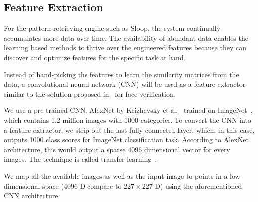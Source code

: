 \subsection{Feature Extraction} 

For the pattern retrieving engine such as Sloop, the system continually
accumulates more data over time. The availability of abundant data enables the
learning based methods to thrive over the engineered features because they can
discover and optimize features for the specific task at hand.

Instead of hand-picking the features to learn the similarity matrices from the
data, a convolutional neural network (CNN) will be used as a feature extractor
similar to the solution proposed in~\cite{chopra05} for face verification.

We use a pre-trained CNN, AlexNet by Krizhevsky et al.~\cite{kriz12} trained on
ImageNet~\cite{imagenet}, which contains 1.2 million images with 1000
categories. To convert the CNN into a feature extractor, we strip out the last
fully-connected layer, which, in this case, outputs 1000 class scores for
ImageNet classification task. According to AlexNet architecture, this would
output a sparse 4096 dimensional vector for every images. The technique is
called transfer learning~\cite{transfer}.

We map all the available images as well as the input image to points in a low
dimensional space (4096-D compare to $227 \times 227$-D) using the
aforementioned CNN architecture. 

